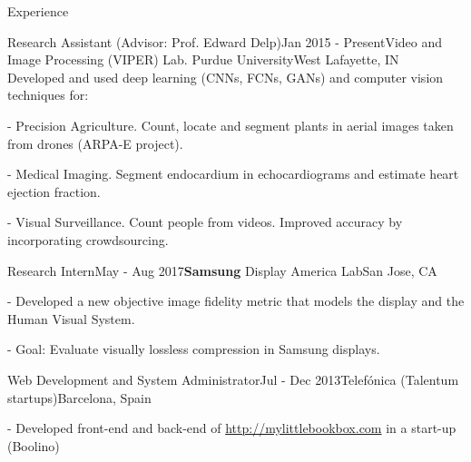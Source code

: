 \documentclass{resume} %
\begin{document}
\begin{rSection}{Experience}

    \begin{rSubsection}{Research Assistant ({\normalfont Advisor}: Prof. Edward Delp)}{Jan 2015 - Present}{Video and Image Processing (VIPER) Lab. Purdue University}{West Lafayette, IN}
\setlength{\itemindent}{.3in}
    ~~~~ Developed and used deep learning (CNNs, FCNs, GANs) and computer vision techniques for:
\item[-] Precision Agriculture. Count, locate and segment plants in aerial images taken from drones (ARPA-E project).
\item[-] Medical Imaging. Segment endocardium in echocardiograms and estimate heart ejection fraction.
\item[-] Visual Surveillance. Count people from videos. Improved accuracy by incorporating crowdsourcing.
\end{rSubsection}


\begin{rSubsection}{Research Intern}{May - Aug 2017}{\textbf{Samsung} Display America Lab}{San Jose, CA}
\setlength{\itemindent}{.3in}
\item[-] Developed a new objective image fidelity metric that models the display and the Human Visual System.
\item[-] Goal: Evaluate visually lossless compression in Samsung displays.
\end{rSubsection}

\begin{rSubsection}{Web Development and System Administrator}{Jul - Dec 2013}{Telefónica (Talentum startups)}{Barcelona, Spain}
\setlength{\itemindent}{.3in}
\item[-] Developed front-end and back-end of \url{http://mylittlebookbox.com} in a start-up (Boolino)
{}
\end{rSubsection}

\vspace{5pt}

\end{rSection}

\end{document}
